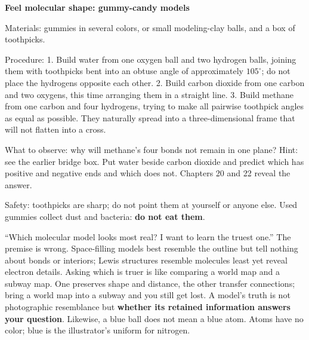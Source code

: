 \begin{shiyan}
\textbf{Feel molecular shape: gummy-candy models}

Materials: gummies in several colors, or small modeling-clay balls, and a box of toothpicks.

Procedure: 1. Build water from one oxygen ball and two hydrogen balls, joining them with toothpicks bent into an obtuse angle of approximately $105^{\circ}$; do not place the hydrogens opposite each other. 2. Build carbon dioxide from one carbon and two oxygens, this time arranging them in a straight line. 3. Build methane from one carbon and four hydrogens, trying to make all pairwise toothpick angles as equal as possible. They naturally spread into a three-dimensional frame that will not flatten into a cross.

What to observe: why will methane's four bonds not remain in one plane? Hint: see the earlier bridge box. Put water beside carbon dioxide and predict which has positive and negative ends and which does not. Chapters 20 and 22 reveal the answer.

Safety: toothpicks are sharp; do not point them at yourself or anyone else. Used gummies collect dust and bacteria: \textbf{do not eat them}.
\end{shiyan}

\begin{wuqu}
``Which molecular model looks most real? I want to learn the truest one.'' The premise is wrong. Space-filling models best resemble the outline but tell nothing about bonds or interiors; Lewis structures resemble molecules least yet reveal electron details. Asking which is truer is like comparing a world map and a subway map. One preserves shape and distance, the other transfer connections; bring a world map into a subway and you still get lost. A model's truth is not photographic resemblance but \textbf{whether its retained information answers your question}. Likewise, a blue ball does not mean a blue atom. Atoms have no color; blue is the illustrator's uniform for nitrogen.
\end{wuqu}

